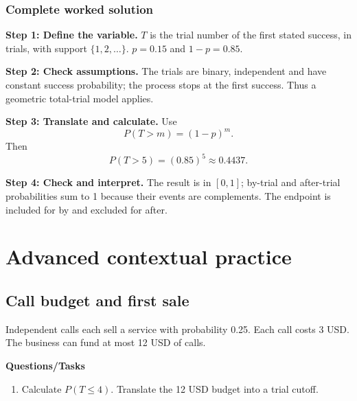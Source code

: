 \subsubsection*{Complete worked solution}
\par\noindent\begin{minipage}{\linewidth}
\textbf{Step 1: Define the variable.} $T$ is the trial number of the first stated success, in trials, with support $\{1,2,\ldots\}$. $p=0.15$ and $1-p=0.85$.
\end{minipage}\par\medskip
\par\noindent\begin{minipage}{\linewidth}
\textbf{Step 2: Check assumptions.} The trials are binary, independent and have constant success probability; the process stops at the first success. Thus a geometric total-trial model applies.
\end{minipage}\par\medskip
\par\noindent\begin{minipage}{\linewidth}
\textbf{Step 3: Translate and calculate.} Use
\[P(T>m)=(1-p)^m.\]
Then
\[P(T>5)=(0.85)^5\approx 0.4437.\]
\end{minipage}\par\medskip
\par\noindent\begin{minipage}{\linewidth}
\textbf{Step 4: Check and interpret.} The result is in $[0,1]$; by-trial and after-trial probabilities sum to 1 because their events are complements. The endpoint is included for by and excluded for after. 
\end{minipage}\par\medskip
{}
\section{Advanced contextual practice}\label{sec:t2-c5-advanced}
\subsection{Call budget and first sale}
Independent calls each sell a service with probability 0.25. Each call costs 3 USD. The business can fund at most 12 USD of calls.

\textbf{Questions/Tasks}
\begin{enumerate}
\item Calculate $P(T\leq4)$. Translate the 12 USD budget into a trial cutoff.
\end{enumerate}
